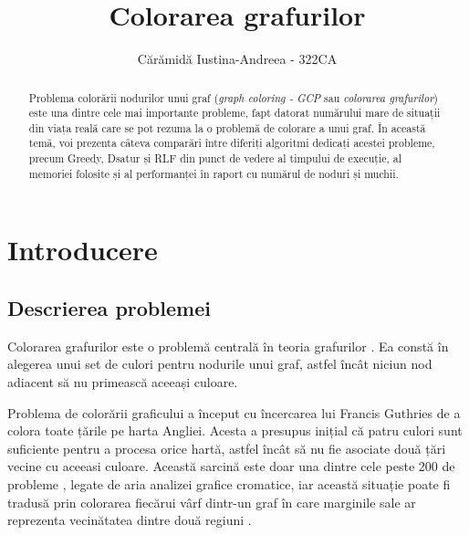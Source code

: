 \documentclass[runningheads]{llncs}
\begin{document}
%
\title{Colorarea grafurilor}
%
\author{Cărămidă Iustina-Andreea - 322CA}
%
%
\maketitle              %
%
\begin{abstract}
    Problema colorării nodurilor unui graf (\textit{graph coloring - GCP} sau \textit{colorarea grafurilor})
    este una dintre cele mai importante probleme, fapt datorat numărului mare de situații din viața reală
    care se pot rezuma la o problemă de colorare a unui graf. În această temă, voi prezenta câteva comparări 
    între diferiți algoritmi dedicați acestei probleme, precum Greedy, Dsatur și RLF din 
    punct de vedere al timpului de execuție, al memoriei folosite și al performanței în raport cu numărul 
    de noduri și muchii.


\end{abstract}


\section{Introducere}
\subsection{Descrierea problemei}

Colorarea grafurilor este o problemă centrală în teoria grafurilor \cite{1}. Ea 
constă în alegerea unui set de culori pentru nodurile unui graf, astfel încât 
niciun nod adiacent să nu primească aceeași culoare.

Problema de colorării graficului a început cu încercarea lui 
Francis Guthries de a colora toate țările pe harta Angliei. 
Acesta a presupus inițial că patru culori sunt suficiente pentru a procesa orice 
hartă, astfel încât să nu fie asociate două țări vecine
cu aceeasi culoare. Această sarcină este doar una dintre cele peste 200 de probleme
\cite{2}, legate de aria analizei grafice cromatice,
iar această situație poate fi tradusă prin colorarea fiecărui vârf
dintr-un graf în care marginile sale ar reprezenta vecinătatea
dintre două regiuni \cite{3}.
\end{document}
